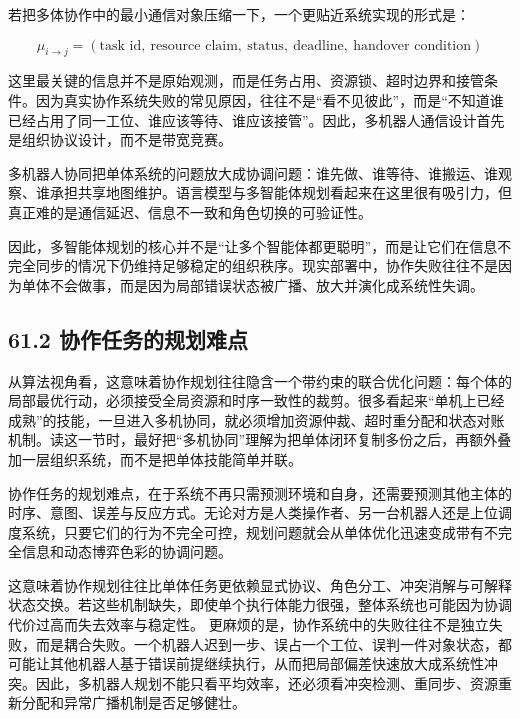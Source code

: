 若把多体协作中的最小通信对象压缩一下，一个更贴近系统实现的形式是：

\begingroup
\scriptsize
\begin{equation*}
\mu_{i\rightarrow j} = (\text{task id},\ \text{resource claim},\ \text{status},\ \text{deadline},\ \text{handover condition})
\end{equation*}
\endgroup

这里最关键的信息并不是原始观测，而是任务占用、资源锁、超时边界和接管条件。因为真实协作系统失败的常见原因，往往不是“看不见彼此”，而是“不知道谁已经占用了同一工位、谁应该等待、谁应该接管”。因此，多机器人通信设计首先是组织协议设计，而不是带宽竞赛。

多机器人协同把单体系统的问题放大成协调问题：谁先做、谁等待、谁搬运、谁观察、谁承担共享地图维护。语言模型与多智能体规划看起来在这里很有吸引力，但真正难的是通信延迟、信息不一致和角色切换的可验证性。

因此，多智能体规划的核心并不是“让多个智能体都更聪明”，而是让它们在信息不完全同步的情况下仍维持足够稳定的组织秩序。现实部署中，协作失败往往不是因为单体不会做事，而是因为局部错误状态被广播、放大并演化成系统性失调。

\subsection*{61.2 协作任务的规划难点}


从算法视角看，这意味着协作规划往往隐含一个带约束的联合优化问题：每个体的局部最优行动，必须接受全局资源和时序一致性的裁剪。很多看起来“单机上已经成熟”的技能，一旦进入多机协同，就必须增加资源仲裁、超时重分配和状态对账机制。读这一节时，最好把“多机协同”理解为把单体闭环复制多份之后，再额外叠加一层组织系统，而不是把单体技能简单并联。

协作任务的规划难点，在于系统不再只需预测环境和自身，还需要预测其他主体的时序、意图、误差与反应方式。无论对方是人类操作者、另一台机器人还是上位调度系统，只要它们的行为不完全可控，规划问题就会从单体优化迅速变成带有不完全信息和动态博弈色彩的协调问题。

这意味着协作规划往往比单体任务更依赖显式协议、角色分工、冲突消解与可解释状态交换。若这些机制缺失，即使单个执行体能力很强，整体系统也可能因为协调代价过高而失去效率与稳定性。 更麻烦的是，协作系统中的失败往往不是独立失败，而是耦合失败。一个机器人迟到一步、误占一个工位、误判一件对象状态，都可能让其他机器人基于错误前提继续执行，从而把局部偏差快速放大成系统性冲突。因此，多机器人规划不能只看平均效率，还必须看冲突检测、重同步、资源重新分配和异常广播机制是否足够健壮。

